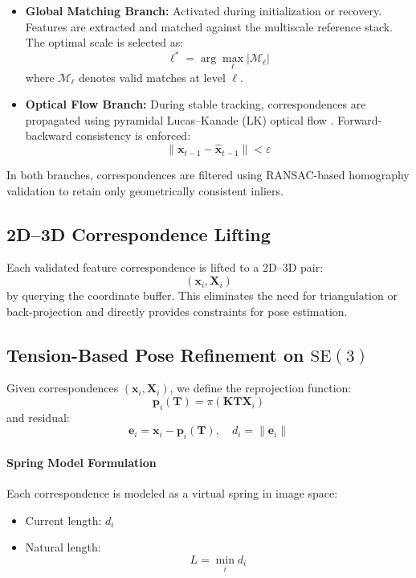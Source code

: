 \begin{itemize}
    \item \textbf{Global Matching Branch:} Activated during initialization or recovery. Features are extracted and matched against the multiscale reference stack. The optimal scale is selected as:
    \[
    \ell^* = \arg\max_\ell |\mathcal{M}_\ell|
    \]
    where $\mathcal{M}_\ell$ denotes valid matches at level $\ell$.
    
    \item \textbf{Optical Flow Branch:} During stable tracking, correspondences are propagated using pyramidal Lucas--Kanade (LK) optical flow \cite{lucaskanade1981}. Forward-backward consistency is enforced:
    \[
    \|\mathbf{x}_{t-1} - \hat{\mathbf{x}}_{t-1}\| < \varepsilon
    \]
\end{itemize}

In both branches, correspondences are filtered using RANSAC-based homography validation to retain only geometrically consistent inliers.

\subsection{2D--3D Correspondence Lifting}

Each validated feature correspondence is lifted to a 2D--3D pair:
\[
(\mathbf{x}_i, \mathbf{X}_i)
\]
by querying the coordinate buffer. This eliminates the need for triangulation or back-projection and directly provides constraints for pose estimation.

\subsection{Tension-Based Pose Refinement on $\mathrm{SE}(3)$}

Given correspondences $(\mathbf{x}_i, \mathbf{X}_i)$, we define the reprojection function:
\[
\mathbf{p}_i(\mathbf{T}) = \pi(\mathbf{K}\mathbf{T}\mathbf{X}_i)
\]
and residual:
\[
\mathbf{e}_i = \mathbf{x}_i - \mathbf{p}_i(\mathbf{T}), \quad d_i = \|\mathbf{e}_i\|
\]

\paragraph{Spring Model Formulation}

Each correspondence is modeled as a virtual spring in image space:

\begin{itemize}
    \item Current length: $d_i$
    \item Natural length:
    \[
    L = \min_i d_i
    \]
\end{itemize}

